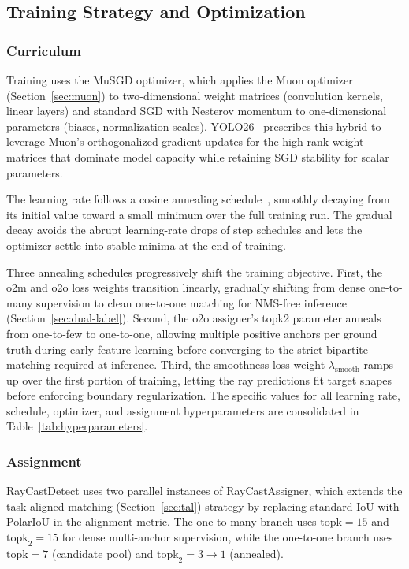 \subsection{Training Strategy and Optimization}
\subsubsection{Curriculum}
\label{sec:curriculum}

Training uses the MuSGD optimizer, which applies the Muon optimizer (Section~\ref{sec:muon}) to two-dimensional weight matrices (convolution kernels, linear layers) and standard SGD with Nesterov momentum to one-dimensional parameters (biases, normalization scales). YOLO26~\cite{sapkota2025yolo26} prescribes this hybrid to leverage Muon's orthogonalized gradient updates for the high-rank weight matrices that dominate model capacity while retaining SGD stability for scalar parameters.

The learning rate follows a cosine annealing schedule~\cite{loshchilov2017sgdr}, smoothly decaying from its initial value toward a small minimum over the full training run. The gradual decay avoids the abrupt learning-rate drops of step schedules and lets the optimizer settle into stable minima at the end of training.

Three annealing schedules progressively shift the training objective. First, the o2m and o2o loss weights transition linearly, gradually shifting from dense one-to-many supervision to clean one-to-one matching for NMS-free inference (Section~\ref{sec:dual-label}). Second, the o2o assigner's topk2 parameter anneals from one-to-few to one-to-one, allowing multiple positive anchors per ground truth during early feature learning before converging to the strict bipartite matching required at inference. Third, the smoothness loss weight $\lambda_{\text{smooth}}$ ramps up over the first portion of training, letting the ray predictions fit target shapes before enforcing boundary regularization. The specific values for all learning rate, schedule, optimizer, and assignment hyperparameters are consolidated in Table~\ref{tab:hyperparameters}.

\subsubsection{Assignment}

RayCastDetect uses two parallel instances of RayCastAssigner, which extends the task-aligned matching (Section~\ref{sec:tal}) strategy by replacing standard IoU with PolarIoU in the alignment metric. The one-to-many branch uses $\text{topk} = 15$ and $\text{topk}_2 = 15$ for dense multi-anchor supervision, while the one-to-one branch uses $\text{topk} = 7$ (candidate pool) and $\text{topk}_2 = 3 \to 1$ (annealed).

